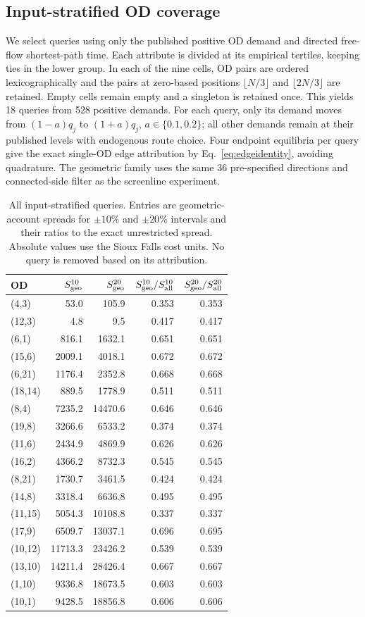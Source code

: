 \subsection{Input-stratified OD coverage}\label{sec:coverage}
We select queries using only the published positive OD demand and directed free-flow shortest-path time. Each attribute is divided at its empirical tertiles, keeping ties in the lower group. In each of the nine cells, OD pairs are ordered lexicographically and the pairs at zero-based positions $\lfloor N/3\rfloor$ and $\lfloor2N/3\rfloor$ are retained. Empty cells remain empty and a singleton is retained once. This yields 18 queries from 528 positive demands. For each query, only its demand moves from $(1-a)q_j$ to $(1+a)q_j$, $a\in\{0.1,0.2\}$; all other demands remain at their published levels with endogenous route choice. Four endpoint equilibria per query give the exact single-OD edge attribution by Eq.~\eqref{eq:edgeidentity}, avoiding quadrature. The geometric family uses the same 36 pre-specified directions and connected-side filter as the screenline experiment.
\begin{table}[t]\centering\small
\caption{All input-stratified queries. Entries are geometric-account spreads for $\pm10\%$ and $\pm20\%$ intervals and their ratios to the exact unrestricted spread. Absolute values use the Sioux Falls cost units. No query is removed based on its attribution.}\label{tab:coverage}
\begin{tabular}{lrrrr}\toprule
OD & $S_{\rm geo}^{10}$ & $S_{\rm geo}^{20}$ & $S_{\rm geo}^{10}/S_{\rm all}^{10}$ & $S_{\rm geo}^{20}/S_{\rm all}^{20}$\\\midrule
(4,3) & 53.0 & 105.9 & 0.353 & 0.353\\
(12,3) & 4.8 & 9.5 & 0.417 & 0.417\\
(6,1) & 816.1 & 1632.1 & 0.651 & 0.651\\
(15,6) & 2009.1 & 4018.1 & 0.672 & 0.672\\
(6,21) & 1176.4 & 2352.8 & 0.668 & 0.668\\
(18,14) & 889.5 & 1778.9 & 0.511 & 0.511\\
(8,4) & 7235.2 & 14470.6 & 0.646 & 0.646\\
(19,8) & 3266.6 & 6533.2 & 0.374 & 0.374\\
(11,6) & 2434.9 & 4869.9 & 0.626 & 0.626\\
(16,2) & 4366.2 & 8732.3 & 0.545 & 0.545\\
(8,21) & 1730.7 & 3461.5 & 0.424 & 0.424\\
(14,8) & 3318.4 & 6636.8 & 0.495 & 0.495\\
(11,15) & 5054.3 & 10108.8 & 0.337 & 0.337\\
(17,9) & 6509.7 & 13037.1 & 0.696 & 0.695\\
(10,12) & 11713.3 & 23426.2 & 0.539 & 0.539\\
(13,10) & 14211.4 & 28426.4 & 0.667 & 0.667\\
(1,10) & 9336.8 & 18673.5 & 0.603 & 0.603\\
(10,1) & 9428.5 & 18856.8 & 0.606 & 0.606\\
\bottomrule\end{tabular}\end{table}
